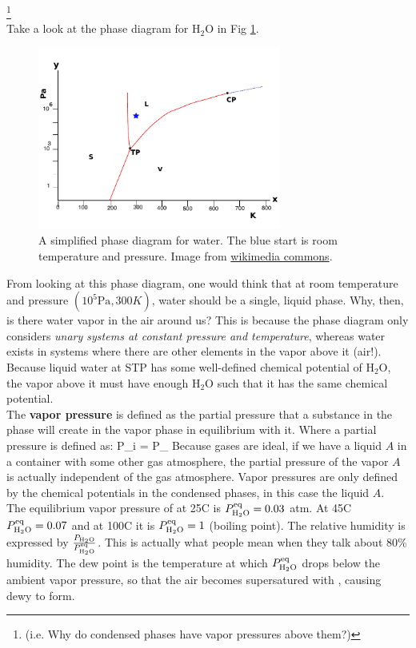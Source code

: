 \documentclass[12pt]{article}
\begin{document}
\footnote{(i.e. Why do condensed phases have vapor pressures above them?)}\\
Take a look at the phase diagram for $\text{H}_2\text{O}$ in Fig \ref{PDH2O}.
\begin{figure}[h]
\centering
\includegraphics[width=8cm]{Water_phase_diagram}
\caption{A simplified phase diagram for water. The blue start is room temperature and pressure. Image from \href{https://commons.wikimedia.org/wiki/File:Water_phase_diagram.svg}{wikimedia commons}.}
\label{PDH2O}
\end{figure}
From looking at this phase diagram, one would think that at room temperature and pressure $\left(10^5\text{Pa}, 300 K\right)$, water should be
a single, liquid phase. Why, then, is there water vapor in the air around us? This is because the phase diagram only considers \textit{unary
systems at constant pressure and temperature}, whereas water exists in systems where there are other elements in the vapor above it (air!). Because liquid water at STP has some well-defined chemical potential of $\text{H}_2\text{O}$, the vapor above it must have enough $\text{H}_2\text{O}$ such that it has the same chemical potential.\\

The \textbf{vapor pressure} is defined as the partial pressure that a substance in the  phase will create in the vapor phase in equilibrium with it. Where a partial pressure is defined as:
\eqs
P_i =  P_
\eqe
Because gases are ideal, if we have a liquid $A$ in a container with some other gas atmosphere, the partial pressure of the vapor $A$ is actually independent of the gas atmosphere. Vapor pressures are only defined by the chemical potentials in the condensed phases, in this case the liquid $A$.\\

 The equilibrium vapor pressure of  at 25\degree C is $P_{\ce{H2O}}^{\text{eq}} = 0.03$ atm.  At 45\degree C $P_{\ce{H2O}}^{\text{eq}}= 0.07$ and at 100\degree C it is $P_{\ce{H2O}}^{\text{eq}}= 1$ (boiling point). The relative humidity is expressed by $\frac{P_{\ce{H_2O}}}{P_{\ce{H_2O}}^{\text{eq}}}$. This is actually what people mean when they talk about 80\% humidity. The dew point is the temperature at which $P_{\ce{H2O}}^{\text{eq}}$ drops below the ambient vapor pressure, so that the air becomes supersatured with , causing dewy to form.
\end{document}
